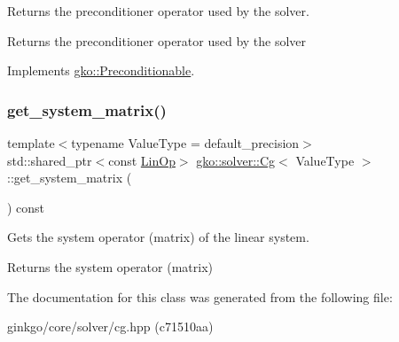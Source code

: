Returns the preconditioner operator used by the solver. 

\begin{DoxyReturn}{Returns}
the preconditioner operator used by the solver 
\end{DoxyReturn}


Implements \hyperlink{classgko_1_1Preconditionable_ad9545089aef0dfc83bc7a74e5bf1d748}{gko\+::\+Preconditionable}.

\mbox{\label{classgko_1_1solver_1_1Cg_a09d50a99fdc668316757ee253386ad2a}} 
\subsubsection{\texorpdfstring{get\+\_\+system\+\_\+matrix()}{get\_system\_matrix()}}
{\footnotesize\ttfamily template$<$typename Value\+Type  = default\+\_\+precision$>$ \\
std\+::shared\+\_\+ptr$<$const \hyperlink{classgko_1_1LinOp}{Lin\+Op}$>$ \hyperlink{classgko_1_1solver_1_1Cg}{gko\+::solver\+::\+Cg}$<$ Value\+Type $>$\+::get\+\_\+system\+\_\+matrix (\begin{DoxyParamCaption}{ }\end{DoxyParamCaption}) const\hspace{0.3cm}{\ttfamily [inline]}}



Gets the system operator (matrix) of the linear system. 

\begin{DoxyReturn}{Returns}
the system operator (matrix) 
\end{DoxyReturn}


The documentation for this class was generated from the following file\+:\begin{DoxyCompactItemize}
\item 
ginkgo/core/solver/cg.\+hpp (c71510aa)\end{DoxyCompactItemize}

